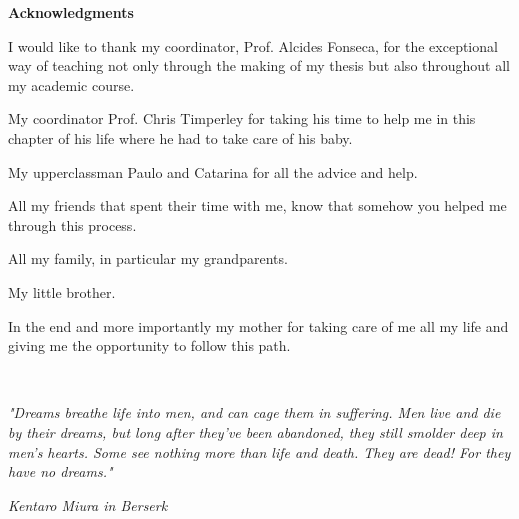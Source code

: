 
\pagestyle{plain}

\vspace*{2cm}
\begin{center}
\Large \bf Acknowledgments
\end{center}
\vspace*{1cm} \setlength{\baselineskip}{0.6cm}

    I would like to thank my coordinator, Prof. Alcides Fonseca, for the exceptional way of teaching not only through the making of my thesis but also throughout all my academic course. 

    My coordinator Prof. Chris Timperley for taking his time to help me in this chapter of his life where he had to take care of his baby. 

    My upperclassman Paulo and Catarina for all the advice and help. 

    All my friends that spent their time with me, know that somehow you helped me through this process. 

    All my family, in particular my grandparents. 

    My little brother. 

    In the end and more importantly my mother for taking care of me all my life and giving me the opportunity to follow this path.

\cleardoublepage~\vfill

\begin{flushright}\textit{"Dreams breathe life into men, and can cage them in suffering. Men live and die by their dreams, but long after they've been abandoned, they still smolder deep in men's hearts. Some see nothing more than life and death. They are dead! For they have no dreams."}\end{flushright}
\begin{flushright}\textit{Kentaro Miura in Berserk}\end{flushright}

